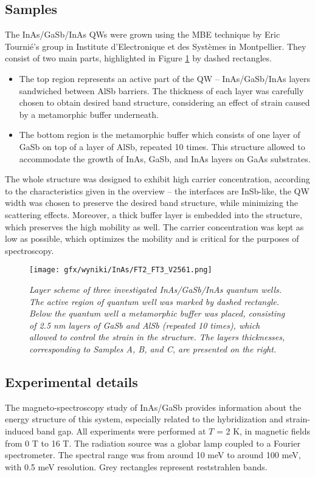 \documentclass[titlepage,a4paper]{book}
\newcommand{\wciecie}{\quad\phantom{v}}
\begin{document}
\subsection{Samples}
\wciecie
The InAs/GaSb/InAs QWs were grown using the MBE technique by Eric Tournié's group in Institute d'Electronique et des Systèmes in Montpellier. They consist of two main parts, highlighted in Figure \ref{fig:Samples_InAs} by dashed rectangles. 
\begin{itemize}
\item The top region represents an active part of the QW -- InAs/GaSb/InAs layers sandwiched between AlSb barriers. The thickness of each layer was carefully chosen to obtain desired band structure, considering an effect of strain caused by a metamorphic buffer underneath.
\item The bottom region is the metamorphic buffer \cite{Yu_InAs} which consists of one layer of GaSb on top of a layer of AlSb, repeated 10 times. This structure allowed to accommodate the growth of InAs, GaSb, and InAs layers on GaAs substrates.
\end{itemize}

The whole structure was designed to exhibit high carrier concentration, according to the characteristics given in the overview -- the interfaces are InSb-like, the QW width was chosen to preserve the desired band structure, while minimizing the scattering effects. Moreover, a thick buffer layer is embedded into the structure, which preserves the high mobility as well. The carrier concentration was kept as low as possible, which optimizes the mobility and is critical for the purposes of spectroscopy. 
 
\begin{figure}[H]
	\centering
	\texttt{[image: gfx/wyniki/InAs/FT2\_FT3\_V2561.png]}
	\vspace{-10pt}
	\caption{\textit{Layer scheme of three investigated InAs/GaSb/InAs quantum wells. The active region of quantum well was marked by dashed rectangle. Below the quantum well a metamorphic buffer was placed, consisting of 2.5 nm layers of GaSb and AlSb (repeated 10 times), which allowed to control the strain in the structure. The layers thicknesses, corresponding to Samples A, B, and C, are presented on the right.}}
	\label{fig:Samples_InAs}
\end{figure}

\subsection{Experimental details}
\wciecie
The magneto-spectroscopy study of InAs/GaSb provides information about the energy structure of this system, especially related to the hybridization and strain-induced band gap. All experiments were performed at $T$ = 2 K, in magnetic fields from 0 T to 16 T. The radiation source was a globar lamp coupled to a Fourier spectrometer. The spectral range was from around 10 meV to around 100 meV, with 0.5 meV resolution. Grey rectangles represent reststrahlen bands.
\end{document}
